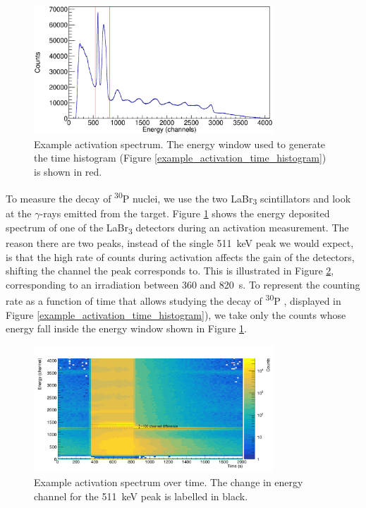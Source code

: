 \documentclass[a4paper,12pt]{report}
\newcommand{\Piso}{\textsuperscript{30}P }
\begin{document}
\begin{figure}[H]
	\centering
	\includegraphics[width=0.80\textwidth]{example_activation_energy_histogram.eps}
	\caption{Example activation spectrum.
	The energy window used to generate the time histogram (Figure \ref{example_activation_time_histogram}) is shown in red.}	%
	\label{example_activation_energy_histogram}
\end{figure}

To measure the decay of \Piso nuclei, we use the two LaBr\textsubscript{3} scintillators and look at the $\gamma$-rays emitted from the target.
Figure \ref{example_activation_energy_histogram} shows the energy deposited spectrum of one of the LaBr\textsubscript{3} detectors during an activation measurement.
The reason there are two peaks, instead of the single \qty{511}{\keV} peak we would expect, is that the high rate of counts during activation affects the gain of the detectors, shifting the channel the peak corresponds to.
This is illustrated in Figure \ref{example_activation_energytime}, corresponding to an irradiation between 360 and \qty{820}{\s}.
To represent the counting rate as a function of time that allows studying the decay of \Piso, displayed in Figure \ref{example_activation_time_histogram}), we take only the counts whose energy fall inside the energy window shown in Figure \ref{example_activation_energy_histogram}.

\begin{figure}[H]
	\centering
	\includegraphics[width=0.80\textwidth]{example_activation_energytime.png} %
	\caption{Example activation spectrum over time.	%
	The change in energy channel for the \qty{511}{\keV} peak is labelled in black.}
	\label{example_activation_energytime}
\end{figure}
\end{document}
